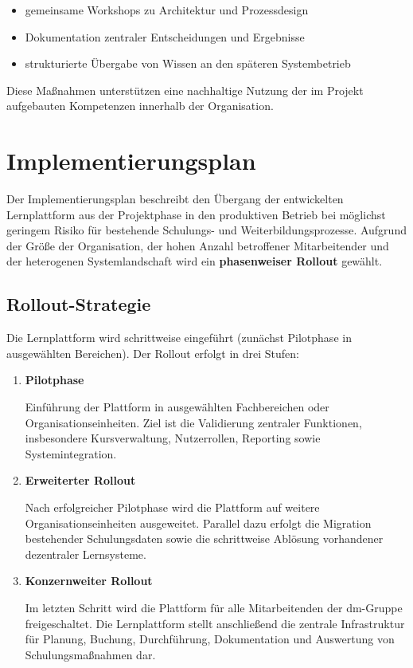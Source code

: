 \begin{itemize}
    \item gemeinsame Workshops zu Architektur und Prozessdesign
    \item Dokumentation zentraler Entscheidungen und Ergebnisse
    \item strukturierte Übergabe von Wissen an den späteren
          Systembetrieb
\end{itemize}

Diese Maßnahmen unterstützen eine nachhaltige Nutzung der im
Projekt aufgebauten Kompetenzen innerhalb der Organisation.

\section{Implementierungsplan}

Der Implementierungsplan beschreibt den Übergang der entwickelten Lernplattform aus der Projektphase in den produktiven Betrieb bei möglichst geringem Risiko für bestehende Schulungs- und Weiterbildungsprozesse. Aufgrund der Größe der Organisation, der hohen Anzahl betroffener Mitarbeitender und der heterogenen Systemlandschaft wird ein \textbf{phasenweiser Rollout} gewählt.

\subsection{Rollout-Strategie}

Die Lernplattform wird schrittweise eingeführt (zunächst Pilotphase in ausgewählten Bereichen). Der Rollout erfolgt in drei Stufen:

\begin{enumerate}

    \item \textbf{Pilotphase}

          Einführung der Plattform in ausgewählten Fachbereichen oder
          Organisationseinheiten. Ziel ist die Validierung zentraler Funktionen,
          insbesondere Kursverwaltung, Nutzerrollen, Reporting sowie
          Systemintegration.

    \item \textbf{Erweiterter Rollout}

          Nach erfolgreicher Pilotphase wird die Plattform auf weitere
          Organisationseinheiten ausgeweitet. Parallel dazu erfolgt die Migration
          bestehender Schulungsdaten sowie die schrittweise Ablösung vorhandener
          dezentraler Lernsysteme.

    \item \textbf{Konzernweiter Rollout}

          Im letzten Schritt wird die Plattform für alle Mitarbeitenden der
          dm-Gruppe freigeschaltet. Die Lernplattform stellt anschließend die
          zentrale Infrastruktur für Planung, Buchung, Durchführung,
          Dokumentation und Auswertung von Schulungsmaßnahmen dar.

\end{enumerate}

